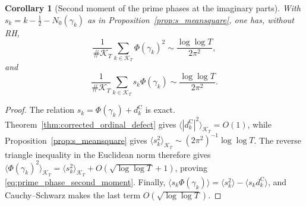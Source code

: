 \documentclass[11pt,a4paper]{article}
\makeatletter
\numberwithin{equation}{section}
\DeclareRobustCommand{\CGref}[1]{\ref{#1}}
\DeclareRobustCommand{\CGeqref}[1]{\eqref{#1}}
\let\CG@origref\ref
\let\CG@origeqref\eqref
\newcommand{\CG@gettip}[1]{\@ifundefined{CGTip@#1}{#1}{\csname CGTip@#1\endcsname}}
\DeclareRobustCommand{\CGref}[1]{\pdftooltip{\CG@origref{#1}}{\CG@gettip{#1}}}
\DeclareRobustCommand{\CGeqref}[1]{\pdftooltip{\CG@origeqref{#1}}{\CG@gettip{#1}}}
\newtheorem{corollary}[theorem]{Corollary}
\theoremstyle{definition}
\theoremstyle{remark}
\newcommand{\Nz}{N_0} %
\newcommand{\Ph}{\Phi}
\makeatother
\begin{document}
\begin{corollary}[Second moment of the prime phases at the imaginary parts]\label{cor:prime_phase_second_moment}
With $s_k=k-\frac12-\Nz(\gamma_k)$ as in
Proposition~\CGref{prop:s_meansquare}, one has, without RH,
\begin{equation}
\frac1{\#\mathcal K_T}\sum_{k\in\mathcal K_T}\Ph(\gamma_k)^2
\sim\frac{\log\log T}{2\pi^2},
\label{eq:prime_phase_second_moment}
\end{equation}
and
\begin{equation}
\frac1{\#\mathcal K_T}\sum_{k\in\mathcal K_T}
 s_k\Ph(\gamma_k)
\sim\frac{\log\log T}{2\pi^2}.
\label{eq:prime_phase_covariance}
\end{equation}
\end{corollary}
\begin{proof}
The relation $s_k=\Ph(\gamma_k)+d_k^{\mathrm C}$ is exact.
Theorem~\CGref{thm:corrected_ordinal_defect} gives
$\langle|d_k^{\mathrm C}|^2\rangle_{\mathcal K_T}=O(1)$, while
Proposition~\CGref{prop:s_meansquare} gives
$\langle s_k^2\rangle_{\mathcal K_T}\sim(2\pi^2)^{-1}\log\log T$.
The reverse triangle inequality in the Euclidean norm therefore gives
$\langle\Ph(\gamma_k)^2\rangle_{\mathcal K_T}
=\langle s_k^2\rangle_{\mathcal K_T}
+O(\sqrt{\log\log T}+1)$, proving
\CGeqref{eq:prime_phase_second_moment}.
Finally,
$\langle s_k\Ph(\gamma_k)\rangle
=\langle s_k^2\rangle-\langle s_kd_k^{\mathrm C}\rangle$,
and Cauchy--Schwarz makes the last term
$O(\sqrt{\log\log T})$.
\end{proof}
\end{document}
